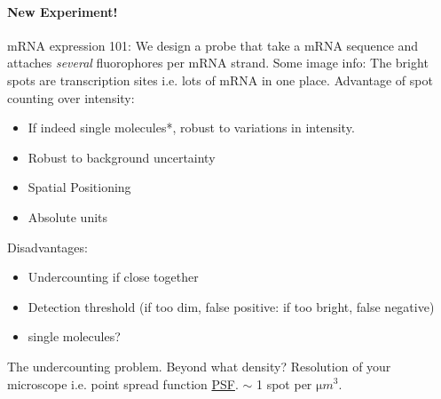 \documentclass[../main.tex]{subfiles}
\begin{document}
\paragraph*{New Experiment!} mRNA expression 101: We design a probe that take a mRNA sequence
and attaches \emph{several} fluorophores per mRNA strand. Some image info: The bright spots are
transcription sites i.e. lots of mRNA in one place. Advantage of spot counting over intensity:
\begin{itemize}
    \item If indeed single molecules*, robust to variations in intensity.
    \item Robust to background uncertainty 
    \item Spatial Positioning
    \item Absolute units
\end{itemize}
Disadvantages:
\begin{itemize}
    \item Undercounting if close together
    \item Detection threshold (if too dim, false positive: if too bright, false negative)
    \item single molecules?
\end{itemize}
The undercounting problem. Beyond what density? Resolution of your microscope i.e. point spread 
function \href{https://en.wikipedia.org/wiki/Point_spread_function}{PSF}. $\sim$ 1 spot per
$\si{\micro m^3}$. 
\end{document}
